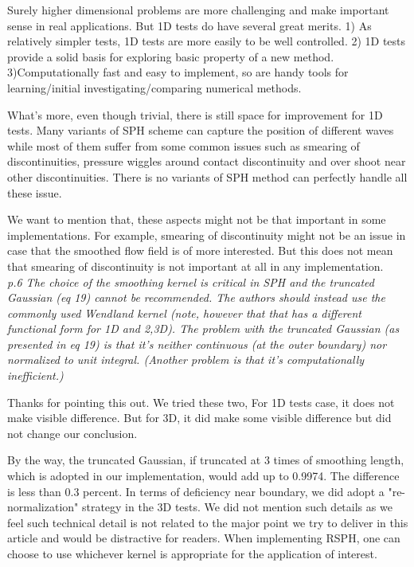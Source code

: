 \documentclass[10pt,a4paper]{article}
\begin{document}
Surely higher dimensional problems are more challenging and make important sense in real applications. 
But 1D tests do have several great merits. 1) As relatively simpler tests, 1D tests are more easily to be well controlled. 2) 1D tests provide a solid basis for exploring basic property of a new method. 3)Computationally fast and easy to implement, so are handy tools for learning/initial investigating/comparing numerical methods. 

What's more, even though trivial, there is still space for improvement for 1D tests. Many variants of SPH scheme can capture the position of different waves while most of them suffer from some common issues such as smearing of discontinuities, pressure wiggles around contact discontinuity and over shoot near other discontinuities. There is no variants of SPH method can perfectly handle all these issue. 

We want to mention that, these aspects might not be that important in some implementations. For example, smearing of discontinuity might not be an issue in case that the smoothed flow field is of more interested. But this does not mean that smearing of discontinuity is not important at all in any implementation.
\\[3pt]

\textit{p.6 The choice of the smoothing kernel is critical in SPH and the truncated Gaussian (eq 19) cannot be recommended. The authors should instead use the commonly used Wendland kernel (note, however that that has a different functional form for 1D and 2,3D). The problem with the truncated Gaussian (as presented in eq 19) is that it's neither continuous (at the outer boundary) nor normalized to unit integral. (Another problem is that it's computationally inefficient.)}

Thanks for pointing this out. We tried these two, For 1D tests case, it does not make visible difference. But for 3D, it did make some visible difference but did not change our conclusion.

By the way, the truncated Gaussian, if truncated at 3 times of smoothing length, which is adopted in our implementation, would add up to 0.9974. The difference is less than 0.3 percent. 
In terms of deficiency near boundary, we did adopt a "re-normalization" strategy in the 3D tests. We did not mention such details as we feel such technical detail is not related to the major point we try to deliver in this article and would be distractive for readers. 
When implementing RSPH, one can choose to use whichever kernel  is appropriate for the application of interest.
\\[3pt]
\end{document}
